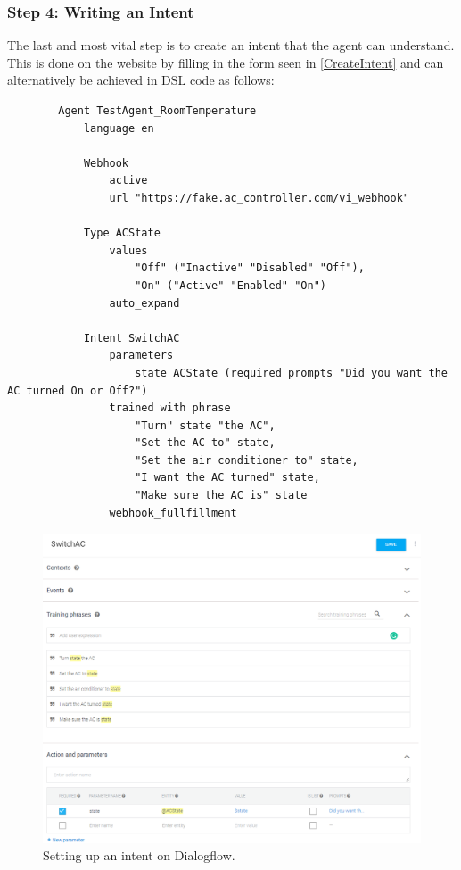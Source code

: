 \subsubsection{Step 4: Writing an Intent}
The last and most vital step is to create an intent that the agent can understand. This is done on the website by filling in the form seen in \autoref{CreateIntent} and can alternatively be achieved in DSL code as follows:
\begin{samepage}
    \begin{lstlisting}
        Agent TestAgent_RoomTemperature
            language en 
                
            Webhook 
                active 
                url "https://fake.ac_controller.com/vi_webhook"

            Type ACState
                values 
                    "Off" ("Inactive" "Disabled" "Off"),
                    "On" ("Active" "Enabled" "On")
                auto_expand

            Intent SwitchAC
                parameters
                    state ACState (required prompts "Did you want the AC turned On or Off?")
                trained with phrase
                    "Turn" state "the AC",
                    "Set the AC to" state,
                    "Set the air conditioner to" state,
                    "I want the AC turned" state,
                    "Make sure the AC is" state
                webhook_fullfillment
    \end{lstlisting}
\end{samepage}

\begin{figure}[ht]
    \centering
    \includegraphics[width=1\textwidth]{Thesis_Images/CreateIntent.PNG}
    \caption{Setting up an intent on Dialogflow.}
        \label{CreateIntent}
\end{figure}

